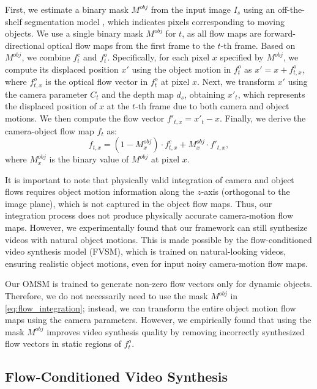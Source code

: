 First, we estimate a binary mask $M^{obj}$ from the input image $I_s$ using an off-the-shelf segmentation model \cite{ravi2024sam}, which indicates pixels corresponding to moving objects. We use a single binary mask $M^{obj}$ for $t$, as all flow maps are forward-directional optical flow maps from the first frame to the $t$-th frame. Based on $M^{obj}$, we combine $f_t^c$ and $f_t^o$.
Specifically, for each pixel $x$ specified by $M^{obj}$, we compute its displaced position $x'$ using the object motion in $f_t^o$ as $x' = x + f_{t,x}^o$, where $f_{t,x}^o$ is the optical flow vector in $f_t^o$ at pixel $x$. Next, we transform $x'$ using the camera parameter $C_t$ and the depth map $d_s$, obtaining $x'_t$, which represents the displaced position of $x$ at the $t$-th frame due to both camera and object motions. We then compute the flow vector $f'_{t,x} = x'_t - x$. 
Finally, we derive the camera-object flow map $f_t$ as:
\begin{equation}
f_{t,x} = (1 - M^{obj}_x) \cdot f_{t,x}^c + M^{obj}_x \cdot f'_{t,x},
\label{eq:flow_integration}
\end{equation}
where $M^{obj}_x$ is the binary value of $M^{obj}$ at pixel $x$.


It is important to note that physically valid integration of camera and object flows requires object motion information along the $z$-axis (orthogonal to the image plane), which is not captured in the object flow maps.
Thus, our integration process does not produce physically accurate camera-motion flow maps.
However, we experimentally found that our framework can still synthesize videos with natural object motions.
This is made possible by the flow-conditioned video synthesis model (FVSM), which is trained on natural-looking videos, ensuring realistic object motions, even for input noisy camera-motion flow maps.

Our OMSM is trained to generate non-zero flow vectors only for dynamic objects. Therefore, we do not necessarily need to use the mask $M^{obj}$ in \cref{eq:flow_integration}; instead, we can transform the entire object motion flow maps using the camera parameters. However, we empirically found that using the mask $M^{obj}$ improves video synthesis quality by removing incorrectly synthesized flow vectors in static regions of $f_t^o$.




\subsection{Flow-Conditioned Video Synthesis}
\label{sec:video_synthesis_model}

